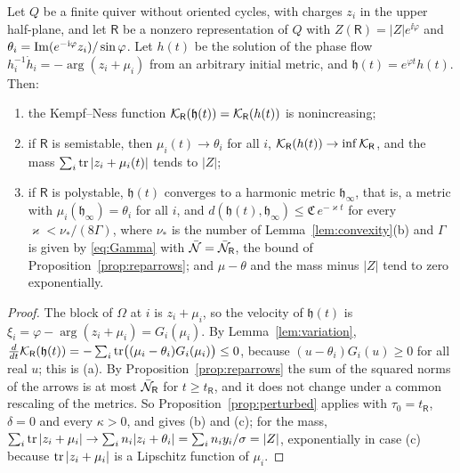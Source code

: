 \begin{theorem}[Representations]\label{thm:representations}
Let $Q$ be a finite quiver without oriented cycles, with charges $z_i$ in the
upper half-plane, and let $\mathsf R$ be a nonzero representation of $Q$
with $Z(\mathsf R)=|Z|e^{\ii\varphi}$ and
$\theta_i=\operatorname{Im}(e^{-\mathrm i\varphi}z_i)/\sin\varphi$. Let $h(t)$ be the solution
of the phase flow $h_i^{-1}\dot h_i=-\arg(z_i+\mu_i)$ from an arbitrary
initial metric, and $\mathfrak h(t)=e^{\varphi t}h(t)$. Then:
\begin{enumerate}
\item[(a)] the Kempf--Ness function $\mathcal K_{\mathsf R}(\mathfrak h(t))=\mathcal K_{\mathsf R}(h(t))$ is
 nonincreasing;
\item[(b)] if $\mathsf R$ is semistable, then $\mu_i(t)\to\theta_i$ for all
 $i$, $\mathcal K_{\mathsf R}(h(t))\to\inf\mathcal K_{\mathsf R}$, and the mass
 $\sum_i\operatorname{tr}|z_i+\mu_i(t)|$ tends to $|Z|$;
\item[(c)] if $\mathsf R$ is polystable, $\mathfrak h(t)$ converges to a
 harmonic metric $\mathfrak h_\infty$, that is, a metric with
 $\mu_i(\mathfrak h_\infty)=\theta_i$ for all $i$, and
 $d(\mathfrak h(t),\mathfrak h_\infty)\leq\mathfrak C\,e^{-\varkappa t}$ for
 every $\varkappa<\nu_*/(8\Gamma)$, where $\nu_*$ is the number of
 Lemma~\ref{lem:convexity}(b) and $\Gamma$ is given by \eqref{eq:Gamma} with
 $\bar{\mathcal N}=\bar{\mathcal N}_{\mathsf R}$, the bound of
 Proposition~\ref{prop:reparrows}; and $\mu-\theta$ and the mass minus $|Z|$
 tend to zero exponentially.
\end{enumerate}
\end{theorem}

\begin{proof}
The block of $\Omega$ at $i$ is $z_i+\mu_i$, so the velocity of
$\mathfrak h(t)$ is $\xi_i=\varphi-\arg(z_i+\mu_i)=G_i(\mu_i)$. By
Lemma~\ref{lem:variation},
$\frac d{dt}\mathcal K_{\mathsf R}(\mathfrak h(t))=-\sum_i\operatorname{tr}\bigl((\mu_i-\theta_i)G_i(\mu_i)\bigr)\leq0$,
because $(u-\theta_i)G_i(u)\geq0$ for all real $u$; this is (a). By
Proposition~\ref{prop:reparrows} the sum of the squared norms of the arrows
is at most $\bar{\mathcal N}_{\mathsf R}$ for $t\geq t_{\mathsf R}$, and it does not
change under a common rescaling of the metrics. So
Proposition~\ref{prop:perturbed} applies with $\tau_0=t_{\mathsf R}$,
$\delta=0$ and every $\kappa>0$, and gives (b) and (c); for the mass,
$\sum_i\operatorname{tr}|z_i+\mu_i|\to\sum_in_i|z_i+\theta_i|=\sum_in_iy_i/\sigma=|Z|$,
exponentially in case (c) because $\operatorname{tr}|z_i+\mu_i|$ is a Lipschitz function of
$\mu_i$.
\end{proof}

